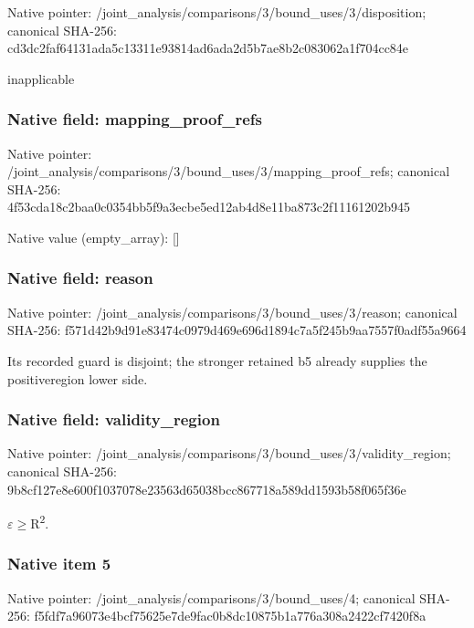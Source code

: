 \documentclass[10pt,a4paper]{article}
\begin{document}
Native pointer: /joint\_analysis/comparis\allowbreak{}ons/3/bound\_uses/3/dispo\allowbreak{}sition; canonical SHA-256: cd3dc2faf64131ada5c13311\allowbreak{}e93814ad6ada2d5b7ae8b2c0\allowbreak{}83062a1f704cc84e


inapplicable


\subsubsection{Native field: mapping\_proof\_refs}


Native pointer: /joint\_analysis/comparis\allowbreak{}ons/3/bound\_uses/3/mappi\allowbreak{}ng\_proof\_refs; canonical SHA-256: 4f53cda18c2baa0c0354bb5f\allowbreak{}9a3ecbe5ed12ab4d8e11ba87\allowbreak{}3c2f11161202b945



Native value (empty\_array): []



\subsubsection{Native field: reason}


Native pointer: /joint\_analysis/comparis\allowbreak{}ons/3/bound\_uses/3/reaso\allowbreak{}n; canonical SHA-256: f571d42b9d91e83474c0979d\allowbreak{}469e696d1894c7a5f245b9aa\allowbreak{}7557f0adf55a9664


Its recorded guard is disjoint; the stronger retained b5 already supplies the positiveregion lower side.


\subsubsection{Native field: validity\_region}


Native pointer: /joint\_analysis/comparis\allowbreak{}ons/3/bound\_uses/3/valid\allowbreak{}ity\_region; canonical SHA-256: 9b8cf127e8e600f1037078e2\allowbreak{}3563d65038bcc867718a589d\allowbreak{}d1593b58f065f36e


\ensuremath{\varepsilon}\ensuremath{\ge}R\textsuperscript{2}.


\subsubsection{Native item 5}


Native pointer: /joint\_analysis/comparis\allowbreak{}ons/3/bound\_uses/4; canonical SHA-256: f5fdf7a96073e4bcf75625e7\allowbreak{}de9fac0b8dc10875b1a776a3\allowbreak{}08a2422cf7420f8a
\end{document}
